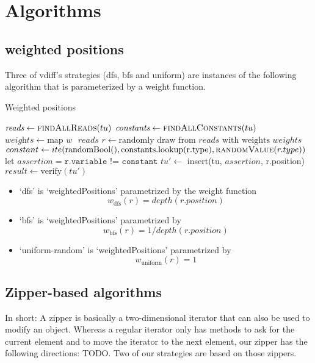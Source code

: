 \documentclass{article}
\begin{document}
\section{Algorithms}

\subsection{weighted positions}
Three of vdiff's strategies (dfs, bfs and uniform) are instances of the following
algorithm that is parameterized by a weight function.

\begin{algorithm}
  \caption{Weighted positions}
  \begin{algorithmic}
  \State $\textit{reads} \gets \Call{findAllReads}{tu}$
  \State $\textit{constants} \gets \Call{findAllConstants}{tu}$
  \State $\textit{weights} \gets \text{map $w$ $reads$} $
      \State $r \gets \text{randomly draw from $reads$ with weights $weights$}$
      \State $constant \gets ite(\text{randomBool()}
      , \text{constants.lookup(r.type)}
      , \Call{randomValue}{r.type})$
      \State let $assertion = \texttt{r.variable != constant}$ 
      \State $tu' \gets$ insert(tu, $assertion$, r.position)
      \State $result \gets \text{verify}(tu')$
  \EndFor
  \EndProcedure
\end{algorithmic}
\end{algorithm}
\begin{itemize}
\item `dfs' is `weightedPositions' parametrized by the weight function
  \[
    w_{\text{dfs}}(r) = depth (r.position)
  \]
\item `bfs' is `weightedPositions' parametrized by
  \[
    w_{\text{bfs}}(r) =  1 / depth(r.position)
  \]
\item `uniform-random' is `weightedPositions' parametrized by
  \[
    w_{\text{uniform}}(r) = 1
  \]
\end{itemize}

\newpage
\subsection{Zipper-based algorithms}
In short: A zipper is basically a two-dimensional iterator that can also be used
to modify an object. Whereas a regular iterator only has methods to ask for the
current element and to move the iterator to the next element, our zipper has the
following directions: TODO.
Two of our strategies are based on those zippers.
\end{document}
